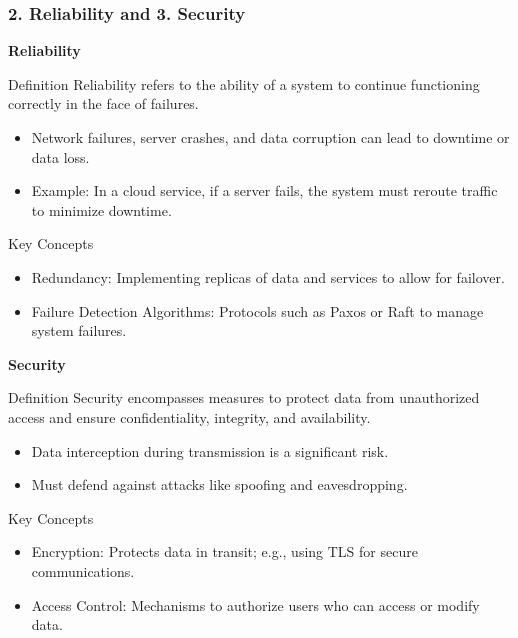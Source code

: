 \documentclass[aspectratio=169]{beamer}
\begin{document}
\begin{frame}[fragile]
  \frametitle{2. Reliability and 3. Security}
  \textbf{Reliability}
  \begin{block}{Definition}
      Reliability refers to the ability of a system to continue functioning correctly in the face of failures.
  \end{block}
  \begin{itemize}
      \item Network failures, server crashes, and data corruption can lead to downtime or data loss.
      \item Example: In a cloud service, if a server fails, the system must reroute traffic to minimize downtime.
  \end{itemize}

  \begin{block}{Key Concepts}
      \begin{itemize}
          \item Redundancy: Implementing replicas of data and services to allow for failover.
          \item Failure Detection Algorithms: Protocols such as Paxos or Raft to manage system failures.
      \end{itemize}
  \end{block}
  
  \textbf{Security}
  \begin{block}{Definition}
      Security encompasses measures to protect data from unauthorized access and ensure confidentiality, integrity, and availability.
  \end{block}
  \begin{itemize}
      \item Data interception during transmission is a significant risk.
      \item Must defend against attacks like spoofing and eavesdropping.
  \end{itemize}

  \begin{block}{Key Concepts}
      \begin{itemize}
          \item Encryption: Protects data in transit; e.g., using TLS for secure communications.
          \item Access Control: Mechanisms to authorize users who can access or modify data.
      \end{itemize}
  \end{block}
\end{frame}
\end{document}
